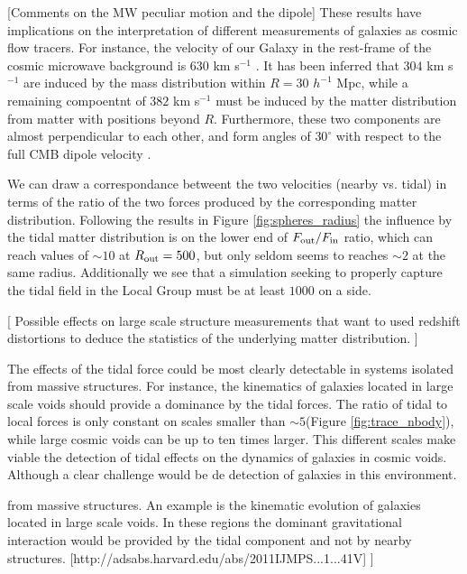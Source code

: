 \documentclass{article}
\newcommand{\hMpc}{{\ifmmode{h^{-1}{\rm Mpc}}\else{$h^{-1}$Mpc }\fi}}
\begin{document}
[Comments on the MW peculiar motion and the dipole]
These results have implications on the interpretation of different
measurements of galaxies as cosmic flow tracers. For instance, the
velocity of our Galaxy in the rest-frame of the cosmic microwave
background is 630 km s$^{-1}$ \cite{Fixsen96}. It has been inferred
that $304$ km s$^{-1}$ are induced by the mass distribution within
$R=30$ $h^{-1}$ Mpc, while a remaining compoentnt of $382$ km s$^{-1}$  must
be induced by the matter distribution from matter with positions
beyond $R$. Furthermore, these two components are almost
perpendicular to each other, and form angles of $30^{\circ}$ with
respect to the full CMB dipole velocity \cite{Courtois12}. 

We can draw a correspondance betweent the two velocities (nearby
vs. tidal) in terms of the ratio of the two forces produced by the
corresponding matter distribution.  Following the results in Figure
\ref{fig:spheres_radius} the
influence by the tidal matter distribution is on the lower end of
$F_{\rm out}/F_{\rm in}$ ratio, which can reach values of $\sim 10$ at
$R_{\rm out}=500$\hMpc, but only seldom seems to reaches $\sim 2$ at
the same radius. Additionally we see that a simulation seeking to
properly capture the tidal field in the Local Group must be at least
$1000$ \hMpc on a side.  


[ Possible effects on large scale structure measurements that want
to used redshift distortions to deduce the statistics of the
underlying matter distribution. ]


The effects of the tidal force could be most clearly detectable in
systems isolated from massive structures. For instance, the kinematics
of galaxies located in large scale voids should provide  a dominance
by the tidal forces. The ratio of tidal to local
forces is only constant on scales smaller than $\sim 5$\hMpc (Figure
\ref{fig:trace_nbody}), while large cosmic voids can be up to ten
times larger. This different scales make viable the detection of tidal
effects on the dynamics of galaxies in cosmic voids. Although a clear
challenge would be de detection of galaxies in this environment.


from massive structures. An example is the kinematic evolution of
galaxies located in large scale voids. In these regions the dominant
gravitational interaction would be provided by the tidal component and
not by nearby structures. [http://adsabs.harvard.edu/abs/2011IJMPS...1...41V] ]
\end{document}
